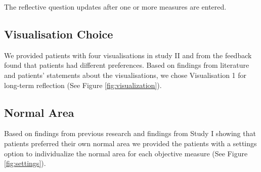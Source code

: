 The reflective question updates after one or more measures are  entered.

\subsection*{Visualisation Choice}
We provided patients with four visualisations in study II and from the feedback found that patients had different preferences. Based on findings from literature and patients' statements about the visualisations, we chose Visualisation 1 for long-term reflection (See Figure \ref{fig:visualization}). 
 
\subsection*{Normal Area}
Based on findings from previous research and findings from Study I showing that patients preferred their own normal area we provided the patients with a settings option to individualize the normal area for each objective measure (See Figure \ref{fig:settings}). 

